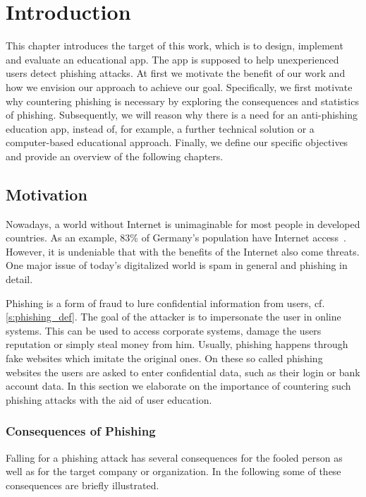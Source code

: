 \section{Introduction}
\label{s:introduction}
This chapter introduces the target of this work, which is to design, implement and evaluate an educational app.
 The app is supposed to help unexperienced users detect phishing attacks.
 At first we motivate the benefit of our work and how we envision our approach to achieve our goal.
Specifically, we first motivate why countering phishing is necessary by exploring the consequences and statistics of phishing.
Subsequently, we will reason why there is a need for an anti-phishing education app, instead of, for example, a further technical solution or a computer-based educational approach.
 Finally, we define our specific objectives and provide an overview of the following chapters.


\subsection{Motivation}
Nowadays, a world without Internet is unimaginable for most people in developed countries.
As an example, 83\% of Germany's population have Internet access~\cite{globalfinance2012internetusage}. 
However, it is undeniable that with the benefits of the Internet also come threats. 
One major issue of today's digitalized world is spam in general and phishing in detail. 

Phishing is a form of fraud to lure confidential information from users, cf. \autoref{s:phishing_def}. The goal of the attacker is to impersonate the user in online systems.
 This can be used to access corporate systems, damage the users reputation or simply steal money from him.
 Usually, phishing happens through fake websites which imitate the original ones.
 On these so called phishing websites the users are asked to enter confidential data, such as their login or bank account data.
 In this section we elaborate on the importance of countering such phishing attacks with the aid of user education. 



\subsubsection{Consequences of Phishing}
Falling for a phishing attack has several consequences for the fooled person as well as for the target company or organization.
 In the following some of these consequences are briefly illustrated.

